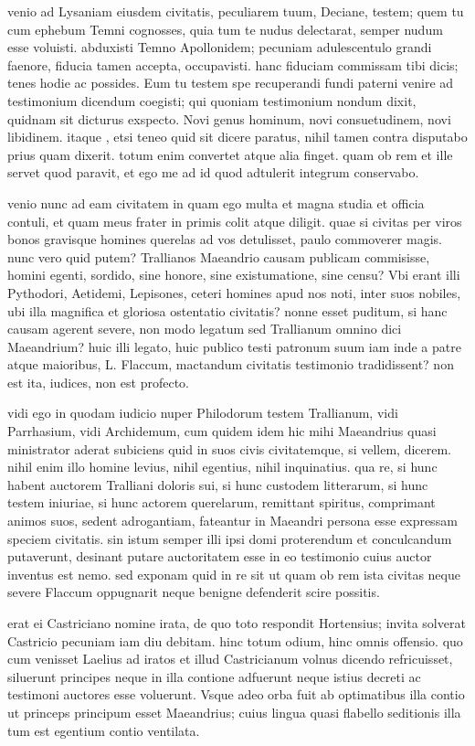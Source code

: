  venio ad Lysaniam eiusdem civitatis, peculiarem tuum, Deciane, testem; quem tu cum ephebum Temni cognosses, quia tum te nudus delectarat, semper nudum esse voluisti. abduxisti Temno Apollonidem; pecuniam adulescentulo grandi faenore, fiducia tamen accepta, occupavisti. hanc fiduciam commissam tibi dicis; tenes hodie ac possides. Eum tu testem spe recuperandi fundi paterni venire ad testimonium dicendum coegisti; qui quoniam testimonium nondum dixit, quidnam sit dicturus exspecto. Novi genus hominum, novi consuetudinem, novi libidinem. itaque , etsi teneo quid sit dicere paratus, nihil tamen contra disputabo prius quam dixerit. totum enim convertet atque alia finget. quam ob rem et ille servet quod paravit, et ego me ad id quod adtulerit integrum conservabo.

 venio nunc ad eam civitatem in quam ego multa et magna studia et officia contuli, et quam meus frater in primis colit atque diligit. quae si civitas per viros bonos gravisque homines querelas ad vos detulisset, paulo commoverer magis. nunc vero quid putem? Trallianos Maeandrio causam publicam commisisse, homini egenti, sordido, sine honore, sine existumatione, sine censu? Vbi erant illi Pythodori, Aetidemi, Lepisones, ceteri homines apud nos noti, inter suos nobiles, ubi illa magnifica et gloriosa ostentatio civitatis? nonne esset puditum, si hanc causam agerent severe, non modo legatum sed Trallianum omnino dici Maeandrium? huic illi legato, huic publico testi patronum suum iam inde a patre atque maioribus, L. Flaccum, mactandum civitatis testimonio tradidissent? non est ita, iudices, non est profecto.

 vidi ego in quodam iudicio nuper Philodorum testem Trallianum, vidi Parrhasium, vidi Archidemum, cum quidem idem hic mihi Maeandrius quasi ministrator aderat subiciens quid in suos civis civitatemque, si vellem, dicerem. nihil enim illo homine levius, nihil egentius, nihil inquinatius. qua re, si hunc habent auctorem Tralliani doloris sui, si hunc custodem litterarum, si hunc testem iniuriae, si hunc actorem querelarum, remittant spiritus, comprimant animos suos, sedent adrogantiam, fateantur in Maeandri persona esse expressam speciem civitatis. sin istum semper illi ipsi domi proterendum et conculcandum putaverunt, desinant putare auctoritatem esse in eo testimonio cuius auctor inventus est nemo. sed exponam quid in re sit ut quam ob rem ista civitas neque severe Flaccum oppugnarit neque benigne defenderit scire possitis.

 erat ei Castriciano nomine irata, de quo toto respondit Hortensius; invita solverat Castricio pecuniam iam diu debitam. hinc totum odium, hinc omnis offensio. quo cum venisset Laelius ad iratos et illud Castricianum volnus dicendo refricuisset, siluerunt principes neque in illa contione adfuerunt neque istius decreti ac testimoni auctores esse voluerunt. Vsque adeo orba fuit ab optimatibus illa contio ut princeps principum esset Maeandrius; cuius lingua quasi flabello seditionis illa tum est egentium contio ventilata.

